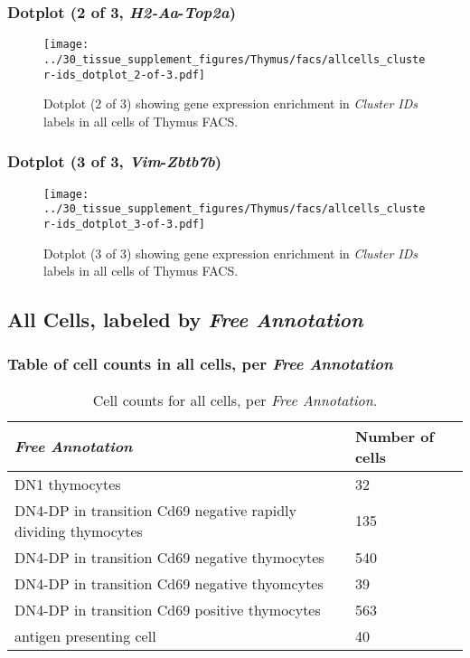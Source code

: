 \clearpage

\subsubsection{Dotplot (2 of 3, \emph{H2-Aa}-\emph{Top2a})}
\begin{figure}[h]
\centering
\texttt{[image: ../30\_tissue\_supplement\_figures/Thymus/facs/allcells\_cluster-ids\_dotplot\_2-of-3.pdf]}

\caption{ Dotplot (2 of 3)  showing gene expression enrichment in \emph{Cluster IDs} labels in all cells of Thymus FACS. }
\end{figure}


\clearpage

\subsubsection{Dotplot (3 of 3, \emph{Vim}-\emph{Zbtb7b})}
\begin{figure}[h]
\centering
\texttt{[image: ../30\_tissue\_supplement\_figures/Thymus/facs/allcells\_cluster-ids\_dotplot\_3-of-3.pdf]}

\caption{ Dotplot (3 of 3)  showing gene expression enrichment in \emph{Cluster IDs} labels in all cells of Thymus FACS. }
\end{figure}


\clearpage

\subsection{All Cells, labeled by \emph{Free Annotation}}
\subsubsection{Table of cell counts in all cells, per \emph{Free Annotation}}\begin{table}[h]
\centering
\label{my-label}
\begin{tabular}{@{}ll@{}}
\toprule

\emph{Free Annotation}& Number of cells \\ \midrule
DN1 thymocytes & 32 \\

DN4-DP in transition Cd69 negative rapidly dividing thymocytes & 135 \\

DN4-DP in transition Cd69 negative thymocytes & 540 \\

DN4-DP in transition Cd69 negative thyomcytes & 39 \\

DN4-DP in transition Cd69 positive thymocytes & 563 \\

antigen presenting cell & 40 \\
\bottomrule
\end{tabular}
\caption{Cell counts for all cells, per \emph{Free Annotation}.}
\end{table}

